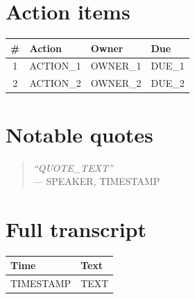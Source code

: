 \documentclass[11pt,a4paper]{article}
\begin{document}
\section{Action items}
\begin{longtable}{clll}
  \toprule
  \# & Action & Owner & Due \\
  \midrule
  \endhead
  1 & {{ACTION_1}} & {{OWNER_1}} & {{DUE_1}} \\
  2 & {{ACTION_2}} & {{OWNER_2}} & {{DUE_2}} \\
  \bottomrule
\end{longtable}

\section{Notable quotes}
\begin{quote}
  \textit{``{{QUOTE_TEXT}}''} \\
  \hfill --- {{SPEAKER}}, {{TIMESTAMP}}
\end{quote}

\appendix
\section{Full transcript}
\begin{longtable}{p{1.6cm}p{14cm}}
  \toprule
  Time & Text \\
  \midrule
  \endhead
  {{TIMESTAMP}} & {{TEXT}} \\
  \bottomrule
\end{longtable}
\end{document}
